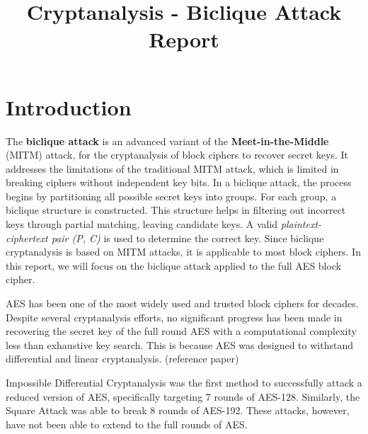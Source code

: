 \documentclass{rapport}
\title{Cryptanalysis - Biclique Attack Report} %
\begin{document}

\subject{INFO-F-537: Cryptanalysis} %




\buildmargins %
\buildcover %
\toc %


\section{Introduction}
The \textbf{biclique attack} is an advanced variant of the \textbf{Meet-in-the-Middle} (MITM) attack, for the cryptanalysis of block ciphers to recover secret keys. It addresses the limitations of the traditional MITM attack, which is limited in breaking ciphers without independent key bits. In a biclique attack, the process begins by partitioning all possible secret keys into groups. For each group, a biclique structure is constructed. This structure helps in filtering out incorrect keys through partial matching, leaving candidate keys. A valid \emph{plaintext-ciphertext pair (P, C)} is used to determine the correct key. Since biclique cryptanalysis is based on MITM attacks, it is applicable to most block ciphers. In this report, we will focus on the biclique attack applied to the full AES block cipher. 

AES has been one of the most widely used and trusted block ciphers for decades. Despite several cryptanalysis efforts, no significant progress has been made in recovering the secret key of the full round AES with a computational complexity less than exhaustive key search. This is because AES was designed to withstand differential and linear cryptanalysis. (reference paper) 

Impossible Differential Cryptanalysis was the first method to successfully attack a reduced version of AES, specifically targeting 7 rounds of AES-128. Similarly, the Square Attack was able to break 8 rounds of AES-192. These attacks, however, have not been able to extend to the full rounds of AES. 
\end{document}
